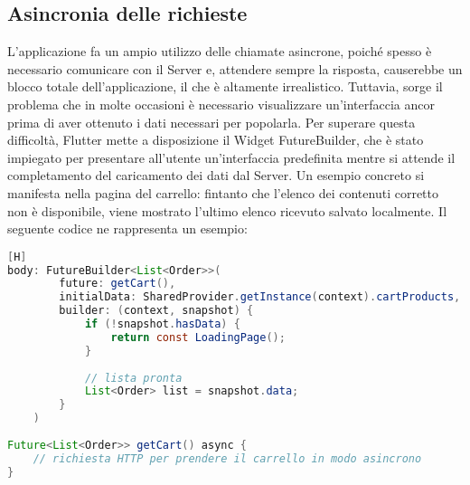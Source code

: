 \subsection{Asincronia delle richieste}
L'applicazione fa un ampio utilizzo delle chiamate asincrone, poiché spesso è necessario comunicare con il Server e, attendere sempre la risposta, causerebbe un blocco totale dell'applicazione, il che è altamente irrealistico. Tuttavia, sorge il problema che in molte occasioni è necessario visualizzare un'interfaccia ancor prima di aver ottenuto i dati necessari per popolarla.
Per superare questa difficoltà, Flutter mette a disposizione il Widget FutureBuilder, che è stato impiegato per presentare all'utente un'interfaccia predefinita mentre si attende il completamento del caricamento dei dati dal Server. Un esempio concreto si manifesta nella pagina del carrello: fintanto che l'elenco dei contenuti corretto non è disponibile, viene mostrato l'ultimo elenco ricevuto salvato localmente. Il seguente codice ne rappresenta un esempio:
\begin{lstlisting}[language=Java, style=longBlock, firstnumber=1][H]
body: FutureBuilder<List<Order>>(
		future: getCart(),
		initialData: SharedProvider.getInstance(context).cartProducts,
		builder: (context, snapshot) {
			if (!snapshot.hasData) {
				return const LoadingPage();
			}
			
			// lista pronta
			List<Order> list = snapshot.data;
		}
	)
	
Future<List<Order>> getCart() async {
	// richiesta HTTP per prendere il carrello in modo asincrono
}
\end{lstlisting}

